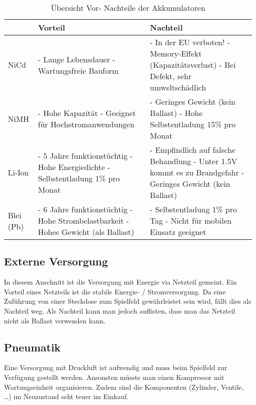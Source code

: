 \begin{table}[h!]
	\begin{tabular}{|p{1cm}|p{5cm}|p{6cm}|} \hline
		          &\textbf{Vorteil}  & \textbf{Nachteil}\tabularnewline \hline
		NiCd      &  - Lange Lebensdauer \newline - Wartungsfreie Bauform & - In der EU verboten! \newline -  Memory-Effekt (Kapazitätsverlust) \newline - Bei Defekt, sehr umweltschädlich \tabularnewline \hline
		NiMH      & - Hohe Kapazität \newline - Geeignet für Hochstromanwendungen  & - Geringes Gewicht (kein Ballast) \newline - Hohe Selbstentladung 15\% pro Monat \tabularnewline \hline
		Li-Ion    & - 5 Jahre funktionstüchtig \newline - Hohe Energiedichte \newline - Selbstentladung 1\% pro Monat & - Empfindlich auf falsche Behandlung \newline - Unter 1.5V kommt es zu Brandgefahr \newline - Geringes Gewicht (kein Ballast) \tabularnewline \hline
		Blei (Pb) & - 6 Jahre funktionstüchtig \newline - Hohe Strombelastbarkeit \newline - Hohes Gewicht (als Ballast)  & - Selbstentladung 1\% pro Tag \newline - Nicht für mobilen Einsatz geeignet  \tabularnewline \hline
	\end{tabular}
	\centering
	\caption{Übersicht Vor- Nachteile der Akkumulatoren}
	\label{tab:UebersichtVorNachTeil} 
\end{table}

\subsection{Externe Versorgung}
In diesem Anschnitt ist die Versorgung mit Energie via Netzteil gemeint. Ein Vorteil eines Netzteils ist die stabile Energie- / Stromversorgung. Da eine Zuführung von einer Steckdose zum Spielfeld gewährleistet sein wird, fällt dies als Nachteil weg. Als Nachteil kann man jedoch auflisten, dass man das Netzteil nicht als Ballast verwenden kann. 

\subsection{Pneumatik}
Eine Versorgung mit Druckluft ist aufwendig und muss beim Spielfeld zur Verfügung gestellt werden. Ansonsten müsste man einen Kompressor mit Wartungseinheit organisieren. Zudem sind die Komponenten (Zylinder, Ventile, …) im Neuzustand seht teuer im Einkauf. 

